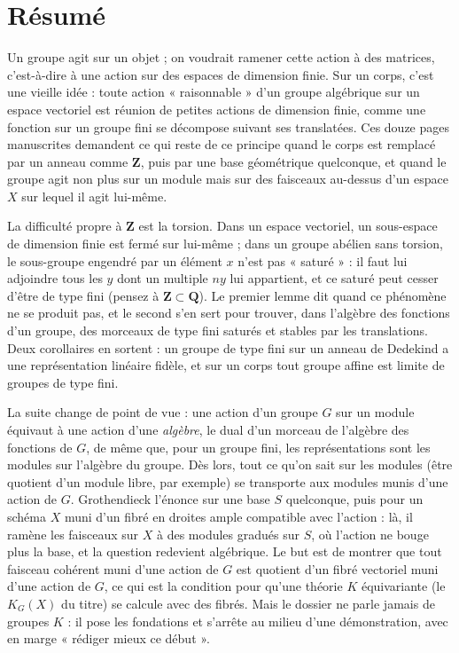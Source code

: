 \documentclass[11pt,a4paper]{article}
\begin{document}
\section*{Résumé}

\begin{resume}
Un groupe agit sur un objet ; on voudrait ramener cette action à des
matrices, c'est-à-dire à une action sur des espaces de dimension finie. Sur
un corps, c'est une vieille idée : toute action « raisonnable » d'un groupe
algébrique sur un espace vectoriel est réunion de petites actions de
dimension finie, comme une fonction sur un groupe fini se décompose suivant
ses translatées. Ces douze pages manuscrites demandent ce qui reste de ce
principe quand le corps est remplacé par un anneau comme $\mathbf{Z}$, puis
par une base géométrique quelconque, et quand le groupe agit non plus sur un
module mais sur des faisceaux au-dessus d'un espace $X$ sur lequel il agit
lui-même.

La difficulté propre à $\mathbf{Z}$ est la torsion. Dans un espace vectoriel,
un sous-espace de dimension finie est fermé sur lui-même ; dans un groupe
abélien sans torsion, le sous-groupe engendré par un élément $x$ n'est pas
« saturé » : il faut lui adjoindre tous les $y$ dont un multiple $ny$ lui
appartient, et ce saturé peut cesser d'être de type fini (pensez à
$\mathbf{Z} \subset \mathbf{Q}$). Le premier lemme dit quand ce
phénomène ne se produit pas, et le second s'en sert pour trouver, dans
l'algèbre des fonctions d'un groupe, des morceaux de type fini saturés et
stables par les translations. Deux corollaires en sortent : un groupe de
type fini sur un anneau de Dedekind a une représentation linéaire fidèle,
et sur un corps tout groupe affine est limite de groupes de type fini.

La suite change de point de vue : une action
d'un groupe $G$ sur un module équivaut à une action d'une \emph{algèbre}, le
dual d'un morceau de l'algèbre des fonctions de $G$, de même que, pour un
groupe fini, les représentations sont les modules sur l'algèbre du groupe.
Dès lors, tout ce qu'on sait sur les modules (être quotient d'un module
libre, par exemple) se transporte aux modules munis d'une action de $G$.
Grothendieck l'énonce sur une base $S$ quelconque, puis pour un schéma $X$
muni d'un fibré en droites ample compatible avec l'action : là, il ramène
les faisceaux sur $X$ à des modules gradués sur $S$, où l'action ne bouge
plus la base, et la question redevient algébrique. Le but est de montrer que tout
faisceau cohérent muni d'une action de $G$ est quotient d'un fibré vectoriel
muni d'une action de $G$, ce qui est la condition pour qu'une théorie $K$
équivariante (le $K_G(X)$ du titre) se calcule avec des fibrés. Mais le
dossier ne parle jamais de groupes $K$ : il pose les fondations et s'arrête
au milieu d'une démonstration, avec en marge « rédiger mieux ce début ».


\end{resume}
\end{document}
